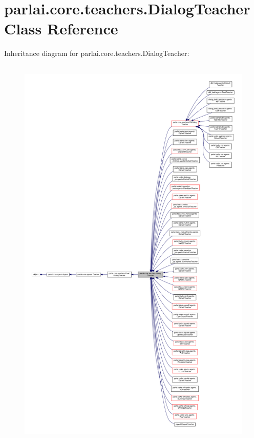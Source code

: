 \hypertarget{classparlai_1_1core_1_1teachers_1_1DialogTeacher}{}\section{parlai.\+core.\+teachers.\+Dialog\+Teacher Class Reference}
\label{classparlai_1_1core_1_1teachers_1_1DialogTeacher}


Inheritance diagram for parlai.\+core.\+teachers.\+Dialog\+Teacher\+:
\nopagebreak
\begin{figure}[H]
\begin{center}
\leavevmode
\includegraphics[height=550pt]{classparlai_1_1core_1_1teachers_1_1DialogTeacher__inherit__graph}
\end{center}
\end{figure}


